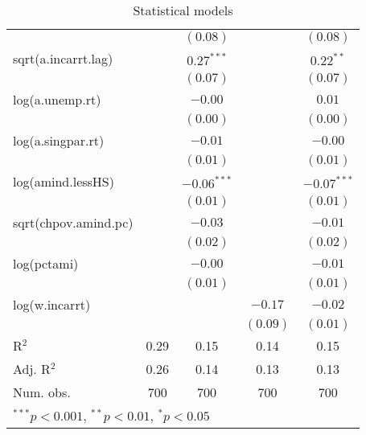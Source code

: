 \begin{table}
\begin{center}
\begin{tabular}{l c c c c }
                     &               & $(0.08)$      &               & $(0.08)$      \\
sqrt(a.incarrt.lag)  &               & $0.27^{***}$  &               & $0.22^{**}$   \\
                     &               & $(0.07)$      &               & $(0.07)$      \\
log(a.unemp.rt)      &               & $-0.00$       &               & $0.01$        \\
                     &               & $(0.00)$      &               & $(0.00)$      \\
log(a.singpar.rt)    &               & $-0.01$       &               & $-0.00$       \\
                     &               & $(0.01)$      &               & $(0.01)$      \\
log(amind.lessHS)    &               & $-0.06^{***}$ &               & $-0.07^{***}$ \\
                     &               & $(0.01)$      &               & $(0.01)$      \\
sqrt(chpov.amind.pc) &               & $-0.03$       &               & $-0.01$       \\
                     &               & $(0.02)$      &               & $(0.02)$      \\
log(pctami)          &               & $-0.00$       &               & $-0.01$       \\
                     &               & $(0.01)$      &               & $(0.01)$      \\
log(w.incarrt)       &               &               & $-0.17$       & $-0.02$       \\
                     &               &               & $(0.09)$      & $(0.01)$      \\
\hline
R$^2$                & 0.29          & 0.15          & 0.14          & 0.15          \\
Adj. R$^2$           & 0.26          & 0.14          & 0.13          & 0.13          \\
Num. obs.            & 700           & 700           & 700           & 700           \\
\hline
\multicolumn{5}{l}{\scriptsize{$^{***}p<0.001$, $^{**}p<0.01$, $^*p<0.05$}}
\end{tabular}
\caption{Statistical models}
\label{table:coefficients}
\end{center}
\end{table}
